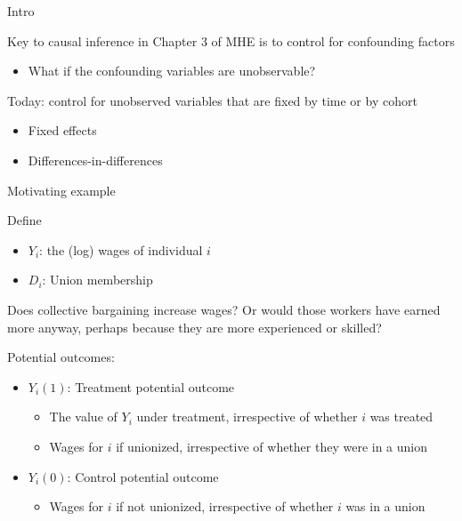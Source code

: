 \documentclass[compress, 8pt]{beamer}
\begin{document}
\begin{frame}{Intro}

Key to causal inference in Chapter 3 of MHE is to control for confounding factors
\begin{itemize}
    \item What if the confounding variables are unobservable?
\end{itemize}

Today: control for unobserved variables that are fixed by time or by cohort
\begin{itemize}
    \item Fixed effects
    \item Differences-in-differences
\end{itemize}

\end{frame}


\begin{frame}{Motivating example}

Define
\begin{itemize}
    \item $Y_i$: the (log) wages of individual $i$
    \item $D_i$: Union membership
\end{itemize}
Does collective bargaining increase wages? Or would those workers have earned more anyway, perhaps because they are more experienced or skilled?

\vspace{3ex}
Potential outcomes:
\begin{itemize}
    \item $Y_i (1)$: Treatment potential outcome
    \begin{itemize}
        \item The value of $Y_i$ under treatment, irrespective of whether $i$ was treated
        \item Wages for $i$ if unionized, irrespective of whether they were in a union
    \end{itemize}
    \item $Y_i (0)$: Control potential outcome
    \begin{itemize}
        \item Wages for $i$ if not unionized, irrespective of whether $i$ was in a union
    \end{itemize}
\end{itemize}

\end{frame}
\end{document}
